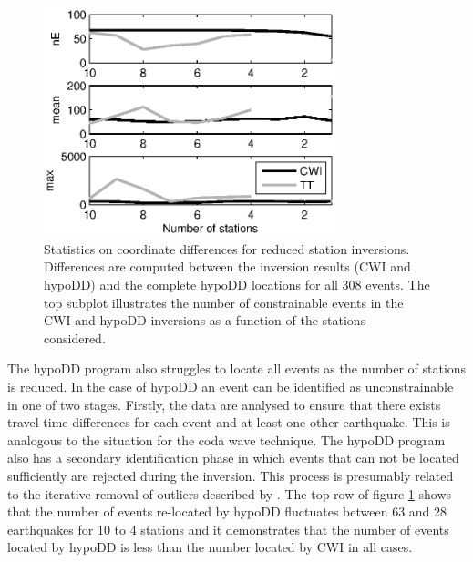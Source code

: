 \documentclass[extra]{gji}
\begin{document}
\begin{figure}
\noindent\includegraphics[width =
20pc]{diags/CalaverasLoc4_hypoDD_SVD.eps} \caption{Statistics on
coordinate differences for reduced station inversions. Differences
are computed between the inversion results (CWI and hypoDD) and the
complete hypoDD locations for all 308 events. The top subplot
illustrates the number of constrainable events in the CWI and hypoDD
inversions as a function of the stations considered.}
\label{fig-statremoval_summarystats}
\end{figure}


The hypoDD program also struggles to locate all events as the number
of stations is reduced. In the case of hypoDD an event can be
identified as unconstrainable in one of two stages. Firstly, the
data are analysed to ensure that there exists travel time
differences for each event and at least one other earthquake. This
is analogous to the situation for the coda wave technique. The
hypoDD program also has a secondary identification phase in which
events that can not be located sufficiently are rejected during the
inversion. This process is presumably related to the iterative
removal of outliers described by \citet{dr_Waldhauser00a}. The top
row of figure \ref{fig-statremoval_summarystats} shows that the
number of events re-located by hypoDD fluctuates between 63 and 28
earthquakes for 10 to 4 stations and it demonstrates that the number
of events located by hypoDD is less than the number located by CWI
in all cases.
\end{document}
